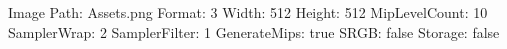 Image Path: Assets\Textures\flame.png
Format: 3
Width: 512
Height: 512
MipLevelCount: 10
SamplerWrap: 2
SamplerFilter: 1
GenerateMips: true
SRGB: false
Storage: false